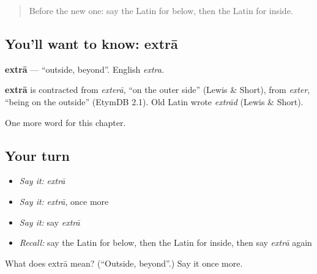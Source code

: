 \begin{quote}
Before the new one: say the Latin for below, then the Latin for inside.
\end{quote}

\subsection*{You'll want to know: extrā}
\textbf{extrā} — \textquotedblleft{}outside, beyond\textquotedblright{}. English \emph{extra}.

\begin{cousinweb}
\textbf{extrā} is contracted from \emph{exterā}, \textquotedblleft{}on the outer side\textquotedblright{} (Lewis \& Short), from \emph{exter}, \textquotedblleft{}being on the outside\textquotedblright{} (EtymDB 2.1). Old Latin wrote \emph{extrād} (Lewis \& Short).
\end{cousinweb}

\begin{grammarlens}[title={What you've built}]
One more word for this chapter.
\end{grammarlens}

\subsection*{Your turn}
\begin{itemize}
\raggedright
  \item \emph{Say it:} \emph{extrā}
  \item \emph{Say it:} \emph{extrā}, once more
  \item \emph{Say it:} say \emph{extrā}
  \item \emph{Recall:} say the Latin for below, then the Latin for inside, then say \emph{extrā} again
\end{itemize}

\begin{tcolorbox}[breakable,colback=teal!4,colframe=teal!35!black,title={Before you move on}]
What does extrā mean? (\textquotedblleft{}Outside, beyond\textquotedblright{}.) Say it once more.
\end{tcolorbox}
